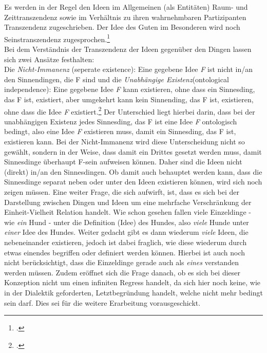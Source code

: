 Es werden in der Regel den Ideen im Allgemeinen (als Entitäten) Raum- und Zeittranszendenz sowie im Verhältnis zu ihren wahrnehmbaren Partizipanten Transzendenz zugeschrieben. Der Idee des Guten im Besonderen wird noch Seinstranszendenz zugesprochen.\footcite[vgl.][S. 347]{StrobelTranszendenz}\\
Bei dem Verständnis der Transzendenz der Ideen gegenüber den Dingen lassen sich zwei Ansätze festhalten:\\
Die \emph{Nicht-Immanenz} (seperate existence): Eine gegebene Idee \emph{F} ist nicht in/an den Sinnendingen, die F sind und die \emph{Unabhängige Existenz}(ontological independence): Eine gegebene Idee \emph{F} kann existieren, ohne dass ein Sinnesding, das F ist, existiert, aber umgekehrt kann kein Sinnending, das F ist, existieren, ohne dass die Idee \emph{F} existiert.\footcite[][S.348]{StrobelTranszendenz}
Der Unterschied liegt hierbei darin, dass bei der unabhängigen Existenz jedes Sinnesding, das F ist eine Idee \emph{F} ontologisch bedingt, also eine Idee \emph{F} existieren muss, damit ein Sinnesding, das F ist, existieren kann. Bei der Nicht-Immanenz wird diese Unterscheidung nicht so gewählt, sondern in der Weise, dass damit ein Drittes gesetzt werden muss, damit Sinnesdinge überhaupt F-sein aufweisen können. Daher sind die Ideen nicht (direkt) in/an den Sinnesdingen. Ob damit auch behauptet werden kann, dass die Sinnesdinge separat neben oder unter den Ideen existieren können, wird sich noch zeigen müssen.
Eine weiter Frage, die sich aufwirft, ist, dass es sich bei der Darstellung zwischen Dingen und Ideen um eine mehrfache Verschränkung der Einheit-Vielheit Relation handelt. Wie schon gesehen fallen viele Einzeldinge - wie \emph{ein} Hund - unter die Definition (Idee) des Hundes, also \emph{viele} Hunde unter \emph{einer} Idee des Hundes. Weiter gedacht gibt es dann wiederum \emph{viele} Ideen, die nebeneinander existieren, jedoch ist dabei fraglich, wie diese wiederum durch etwas einendes begriffen oder definiert werden können. Hierbei ist auch noch nicht berücksichtigt, dass die Einzeldinge gerade auch als \emph{eines} verstanden werden müssen. Zudem eröffnet sich die Frage danach, ob es sich bei dieser Konzeption nicht um einen infiniten Regress handelt, da sich hier noch keine, wie in der Dialektik geforderten, Letztbegründung handelt, welche nicht mehr bedingt sein darf. Dies sei für die weitere Erarbeitung vorausgeschickt.

